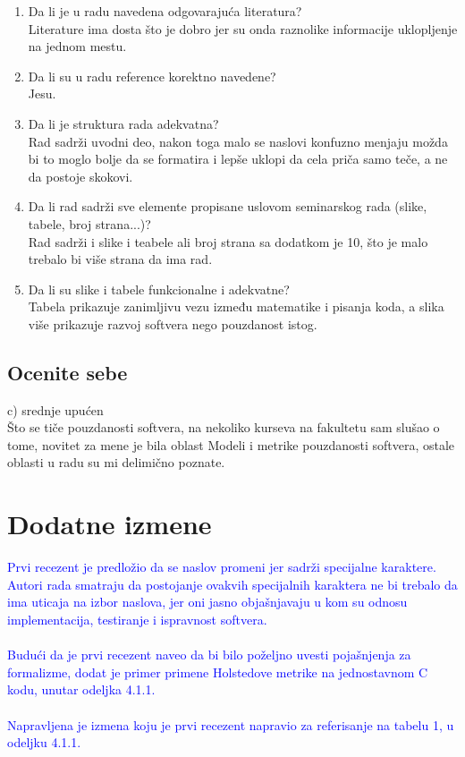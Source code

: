 \documentclass[a4paper]{report}
\newcommand{\odgovor}[1]{\textcolor{blue}{#1}}
\begin{document}
\begin{enumerate}
\item Da li je u radu navedena odgovarajuća literatura?\\ Literature ima dosta što je dobro jer su onda raznolike informacije uklopljenje na jednom mestu.
\item Da li su u radu reference korektno navedene?\\Jesu.
\item Da li je struktura rada adekvatna?\\Rad sadrži uvodni deo, nakon toga malo se naslovi konfuzno menjaju možda bi to moglo bolje da se formatira i lepše uklopi da cela priča samo teče, a ne da postoje skokovi.
\item Da li rad sadrži sve elemente propisane uslovom seminarskog rada (slike, tabele, broj strana...)?\\Rad sadrži i slike i teabele ali broj strana sa dodatkom je 10, što je malo trebalo bi više strana da ima rad.
\item Da li su slike i tabele funkcionalne i adekvatne?\\Tabela prikazuje zanimljivu vezu između matematike i pisanja koda, a slika više prikazuje razvoj softvera nego pouzdanost istog.
\end{enumerate}

\section{Ocenite sebe}
 c) srednje upućen\\
Što se tiče pouzdanosti softvera, na nekoliko kurseva na fakultetu sam slušao o tome, novitet za mene je bila oblast Modeli i metrike pouzdanosti softvera, ostale oblasti u radu su mi delimično poznate.


\chapter{Dodatne izmene}

\odgovor{
Prvi recezent je predložio da se naslov promeni jer sadrži specijalne karaktere. Autori rada smatraju da postojanje ovakvih specijalnih karaktera ne bi trebalo da ima uticaja na izbor naslova, jer oni jasno objašnjavaju u kom su odnosu implementacija, testiranje i ispravnost softvera.
}
\\\\
\odgovor{
Budući da je prvi recezent naveo da bi bilo poželjno uvesti pojašnjenja za formalizme, dodat je primer primene Holstedove metrike na jednostavnom C kodu, unutar odeljka 4.1.1. 
}
\\\\
\odgovor{
Napravljena je izmena koju je prvi recezent napravio za referisanje na tabelu 1, u odeljku 4.1.1.
}
\end{document}
